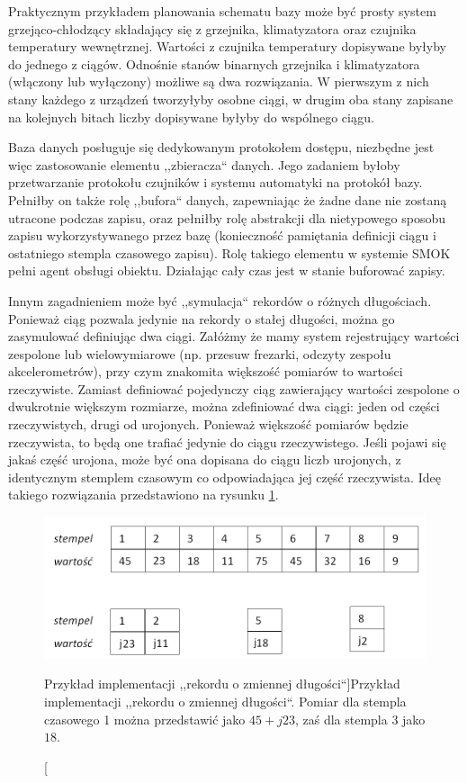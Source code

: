 \documentclass[a4paper,polish,12pt,twoside]{article}
\begin{document}
Praktycznym przykładem planowania schematu bazy może być prosty system grzejąco-chłodzący składający się z grzejnika, klimatyzatora oraz czujnika temperatury wewnętrznej. Wartości z czujnika temperatury dopisywane byłyby do jednego z ciągów. Odnośnie stanów binarnych grzejnika i klimatyzatora (włączony lub wyłączony) możliwe są dwa rozwiązania. W pierwszym z nich stany każdego z urządzeń tworzyłyby osobne ciągi, w drugim oba stany zapisane na kolejnych bitach liczby dopisywane byłyby do wspólnego ciągu.

Baza danych posługuje się dedykowanym protokołem dostępu, niezbędne jest więc zastosowanie elementu ,,zbieracza`` danych. Jego zadaniem byłoby przetwarzanie protokołu czujników i systemu automatyki na protokół bazy. Pełniłby on także rolę ,,bufora`` danych, zapewniając że żadne dane nie zostaną utracone podczas zapisu, oraz pełniłby rolę abstrakcji dla nietypowego sposobu zapisu wykorzystywanego przez bazę (konieczność pamiętania definicji ciągu i ostatniego stempla czasowego zapisu). Rolę takiego elementu w systemie SMOK pełni agent obsługi obiektu. Działając cały czas jest w stanie buforować zapisy. 

Innym zagadnieniem może być ,,symulacja`` rekordów o różnych długościach. Ponieważ ciąg pozwala jedynie na rekordy o stałej długości, można go zasymulować definiując dwa ciągi. Załóżmy że mamy system rejestrujący wartości zespolone lub wielowymiarowe (np. przesuw frezarki, odczyty zespołu akcelerometrów), przy czym znakomita większość pomiarów to wartości rzeczywiste. Zamiast definiować pojedynczy ciąg zawierający wartości zespolone o dwukrotnie większym rozmiarze, można zdefiniować dwa ciągi: jeden od części rzeczywistych, drugi od urojonych. Ponieważ większość pomiarów będzie rzeczywista, to będą one trafiać jedynie do ciągu rzeczywistego. Jeśli pojawi się jakaś część urojona, może być ona dopisana do ciągu liczb urojonych, z identycznym stemplem czasowym co odpowiadająca jej część rzeczywista. Ideę takiego rozwiązania przedstawiono na rysunku \ref{fig:variable_length_record}.

	\begin{figure}[h]
		\centering \includegraphics[width=14cm]{variable_length_record}
		\caption[Przykład implementacji ,,rekordu o zmiennej długości``]{Przykład implementacji ,,rekordu o zmiennej długości``. Pomiar dla stempla czasowego 1 można przedstawić jako $45+j23$, zaś dla stempla 3 jako $18$.}
		\label{fig:variable_length_record}
	\end{figure}
\end{document}
